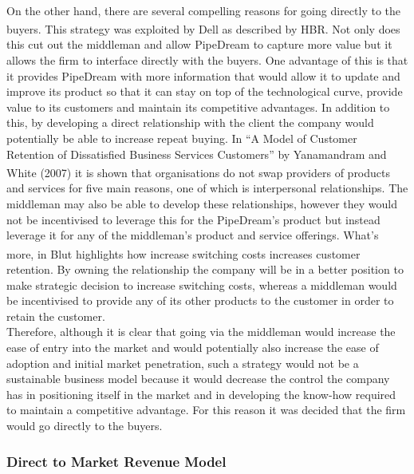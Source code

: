 \documentclass[11pt]{article}		%
\newcommand{\supercite}[1]{\textsuperscript{\cite{#1}}}		%
\begin{document}
            \\
            On the other hand, there are several compelling reasons for going directly to the buyers. This strategy was exploited by Dell as described by HBR.\supercite{business_model}  Not only does this cut out the middleman and allow PipeDream to capture more value but it allows the firm to interface directly with the buyers. One advantage of this is that it provides PipeDream with more information that would allow it to update and improve its product so that it can stay on top of the technological curve, provide value to its customers and maintain its competitive advantages. In addition to this, by developing a direct relationship with the client the company would potentially be able to increase repeat buying. In “A Model of Customer Retention of Dissatisfied Business Services Customers” by Yanamandram and White (2007)\supercite{customers} it is shown that organisations do not swap providers of products and services for five main reasons, one of which is interpersonal relationships. The middleman may also be able to develop these relationships, however they would not be incentivised to leverage this for the PipeDream's product but instead leverage it for any of the middleman’s product and service offerings. What’s more, in Blut\supercite{B2Brelations} highlights how increase switching costs increases customer retention. By owning the relationship the company will be in a better position to make strategic decision to increase switching costs, whereas a middleman would be incentivised to provide any of its other products to the customer in order to retain the customer.
            \\
            Therefore, although it is clear that going via the middleman would increase the ease of entry into the market and would potentially also increase the ease of adoption and initial market penetration, such a strategy would not be a sustainable business model because it would decrease the control the company has in positioning itself in the market and in developing the know-how required to maintain a competitive advantage. For this reason it was decided that the firm would go directly to the buyers.
            
            \subsubsection{Direct to Market Revenue Model}
            
\end{document}
